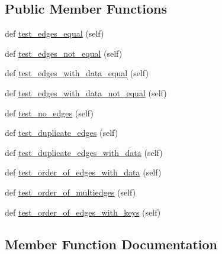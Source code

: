\subsection*{Public Member Functions}
\begin{DoxyCompactItemize}
\item 
def \hyperlink{classnetworkx_1_1testing_1_1tests_1_1test__utils_1_1TestEdgesEqual_a8488447fbb99c37174a5dd7c7d468242}{test\+\_\+edges\+\_\+equal} (self)
\item 
def \hyperlink{classnetworkx_1_1testing_1_1tests_1_1test__utils_1_1TestEdgesEqual_ad948ffbe1bb2c24dc1f59dc955b32ea9}{test\+\_\+edges\+\_\+not\+\_\+equal} (self)
\item 
def \hyperlink{classnetworkx_1_1testing_1_1tests_1_1test__utils_1_1TestEdgesEqual_a8d3d8693bed863d5aec912d994f50105}{test\+\_\+edges\+\_\+with\+\_\+data\+\_\+equal} (self)
\item 
def \hyperlink{classnetworkx_1_1testing_1_1tests_1_1test__utils_1_1TestEdgesEqual_a9aab11a70f4c38e2b064afd09b3c7387}{test\+\_\+edges\+\_\+with\+\_\+data\+\_\+not\+\_\+equal} (self)
\item 
def \hyperlink{classnetworkx_1_1testing_1_1tests_1_1test__utils_1_1TestEdgesEqual_abcdaef7801c0b035b2b6eef1b1634353}{test\+\_\+no\+\_\+edges} (self)
\item 
def \hyperlink{classnetworkx_1_1testing_1_1tests_1_1test__utils_1_1TestEdgesEqual_a854a754263fbeb9e4199c6681440bfcb}{test\+\_\+duplicate\+\_\+edges} (self)
\item 
def \hyperlink{classnetworkx_1_1testing_1_1tests_1_1test__utils_1_1TestEdgesEqual_a250f6343c83dcaae4ea95c5cfe408f54}{test\+\_\+duplicate\+\_\+edges\+\_\+with\+\_\+data} (self)
\item 
def \hyperlink{classnetworkx_1_1testing_1_1tests_1_1test__utils_1_1TestEdgesEqual_a3e4da1813716f0e3c1b2e8817f68d1a7}{test\+\_\+order\+\_\+of\+\_\+edges\+\_\+with\+\_\+data} (self)
\item 
def \hyperlink{classnetworkx_1_1testing_1_1tests_1_1test__utils_1_1TestEdgesEqual_af3a81729e239f5227e25d37981b63059}{test\+\_\+order\+\_\+of\+\_\+multiedges} (self)
\item 
def \hyperlink{classnetworkx_1_1testing_1_1tests_1_1test__utils_1_1TestEdgesEqual_a0f60ea72ddd4640b869bc1401666ec49}{test\+\_\+order\+\_\+of\+\_\+edges\+\_\+with\+\_\+keys} (self)
\end{DoxyCompactItemize}


\subsection{Member Function Documentation}
\mbox{\label{classnetworkx_1_1testing_1_1tests_1_1test__utils_1_1TestEdgesEqual_a854a754263fbeb9e4199c6681440bfcb}} 
